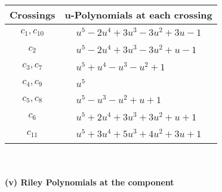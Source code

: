 \documentclass[1p]{elsarticle_modified}
\theoremstyle{definition}
\begin{document}
\begin{tabular}{m{50pt}|m{274pt}}
Crossings & \hspace{64pt}u-Polynomials at each crossing \\
\hline $$\begin{aligned}c_{1},c_{10}\end{aligned}$$&$\begin{aligned}
&u^5-2 u^4+3 u^3-3 u^2+3 u-1
\end{aligned}$\\
\hline $$\begin{aligned}c_{2}\end{aligned}$$&$\begin{aligned}
&u^5-2 u^4+3 u^3-3 u^2+u-1
\end{aligned}$\\
\hline $$\begin{aligned}c_{3},c_{7}\end{aligned}$$&$\begin{aligned}
&u^5+u^4- u^3- u^2+1
\end{aligned}$\\
\hline $$\begin{aligned}c_{4},c_{9}\end{aligned}$$&$\begin{aligned}
&u^5
\end{aligned}$\\
\hline $$\begin{aligned}c_{5},c_{8}\end{aligned}$$&$\begin{aligned}
&u^5- u^3- u^2+u+1
\end{aligned}$\\
\hline $$\begin{aligned}c_{6}\end{aligned}$$&$\begin{aligned}
&u^5+2 u^4+3 u^3+3 u^2+u+1
\end{aligned}$\\
\hline $$\begin{aligned}c_{11}\end{aligned}$$&$\begin{aligned}
&u^5+3 u^4+5 u^3+4 u^2+3 u+1
\end{aligned}$\\
\hline
\end{tabular}\\~\\
\newpage\renewcommand{\arraystretch}{1}
\flushleft \textbf{(v) Riley Polynomials at the component}\newline \\
\end{document}
